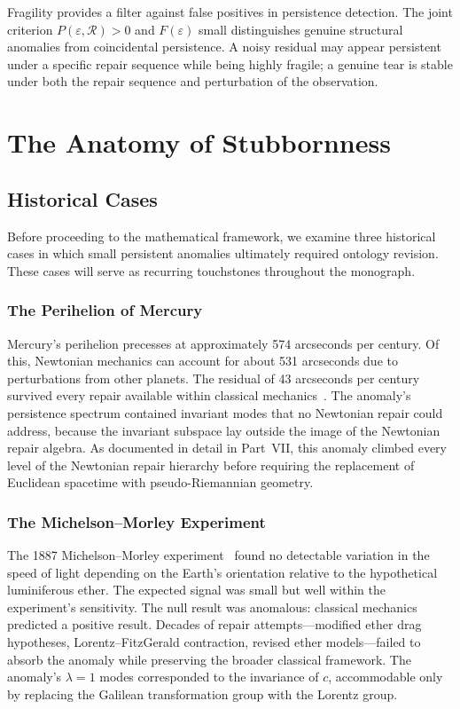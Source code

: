 \documentclass[12pt,oneside]{book}
\theoremstyle{plain}
\theoremstyle{definition}
\theoremstyle{remark}
\newcommand{\R}{\mathcal{R}}
\newcommand{\eps}{\varepsilon}
\newcommand{\1}{\mathbf{1}}
\begin{document}
Fragility provides a filter against false positives in persistence detection. The joint criterion $P(\eps, \R) > 0$ and $F(\eps)$ small distinguishes genuine structural anomalies from coincidental persistence. A noisy residual may appear persistent under a specific repair sequence while being highly fragile; a genuine tear is stable under both the repair sequence and perturbation of the observation.


\chapter{The Anatomy of Stubbornness}

\section{Historical Cases}

Before proceeding to the mathematical framework, we examine three historical cases in which small persistent anomalies ultimately required ontology revision. These cases will serve as recurring touchstones throughout the monograph.

\subsection{The Perihelion of Mercury}

Mercury's perihelion precesses at approximately 574 arcseconds per century. Of this, Newtonian mechanics can account for about 531 arcseconds due to perturbations from other planets. The residual of 43 arcseconds per century survived every repair available within classical mechanics~\cite{will2014}. The anomaly's persistence spectrum contained invariant modes that no Newtonian repair could address, because the invariant subspace lay outside the image of the Newtonian repair algebra. As documented in detail in Part~VII, this anomaly climbed every level of the Newtonian repair hierarchy before requiring the replacement of Euclidean spacetime with pseudo-Riemannian geometry.

\subsection{The Michelson--Morley Experiment}

The 1887 Michelson--Morley experiment~\cite{michelson1887} found no detectable variation in the speed of light depending on the Earth's orientation relative to the hypothetical luminiferous ether. The expected signal was small but well within the experiment's sensitivity. The null result was anomalous: classical mechanics predicted a positive result. Decades of repair attempts---modified ether drag hypotheses, Lorentz--FitzGerald contraction, revised ether models---failed to absorb the anomaly while preserving the broader classical framework. The anomaly's $\lambda = 1$ modes corresponded to the invariance of $c$, accommodable only by replacing the Galilean transformation group with the Lorentz group.
\end{document}
